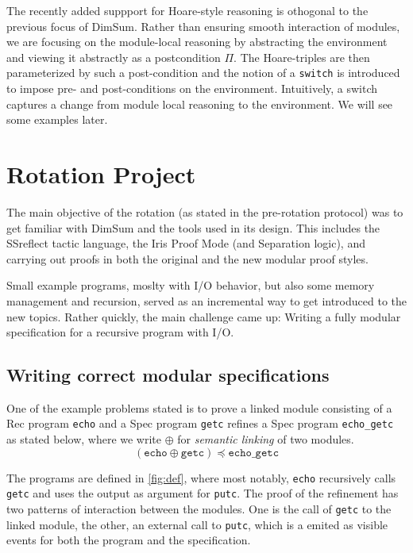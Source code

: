 \documentclass[runningheads, orivec]{llncs}
\begin{document}
The recently added suppport for Hoare-style reasoning is othogonal to the previous focus of DimSum. Rather than ensuring smooth interaction of modules, we are focusing on the module-local reasoning by abstracting the environment and viewing it abstractly as a postcondition $\Pi$. The Hoare-triples are then parameterized by such a post-condition and the notion of a \texttt{switch} is introduced to impose pre- and post-conditions on the environment. Intuitively, a switch captures a change from module local reasoning to the environment. We will see some examples later.

\section{Rotation Project}

The main objective of the rotation (as stated in the pre-rotation protocol) was to get familiar with DimSum and the tools used in its design. This includes the SSreflect tactic language, the Iris Proof Mode (and Separation logic), and carrying out proofs in both the original and the new modular proof styles.

Small example programs, moslty with I/O behavior, but also some memory management and recursion, served as an incremental way to get introduced to the new topics. Rather quickly, the main challenge came up: Writing a fully modular specification for a recursive program with I/O.

\subsection{Writing correct modular specifications}

One of the example problems stated is to prove a linked module consisting of a Rec program \texttt{echo} and a Spec program \texttt{getc} refines a Spec program \texttt{echo\_getc} as stated below, where we write $\oplus$ for \emph{semantic linking} of two modules.
\[(\texttt{echo} \oplus \texttt{getc}) \preceq \texttt{echo\_getc}\]

The programs are defined in \cref{fig:def}, where most notably, \texttt{echo} recursively calls \texttt{getc} and uses the output as argument for \texttt{putc}. The proof of the refinement has two patterns of interaction between the modules. One is the call of \texttt{getc} to the linked module, the other, an external call to \texttt{putc}, which is a emited as visible events for both the program and the specification.
\end{document}

